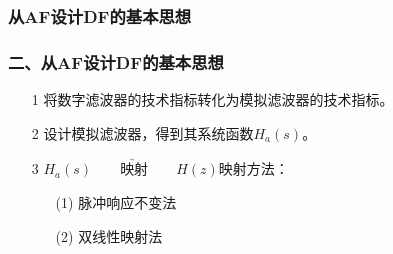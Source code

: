 \documentclass[notheorems,compress,mathserif,table]{beamer}
\begin{document}
\subsubsection{从AF设计DF的基本思想}
\begin{frame}[shrink]\frametitle{二、从AF设计DF的基本思想}%

\begin{enumerate}
  \item [1] 将数字滤波器的技术指标转化为模拟滤波器的技术指标。 \newline
  \item [2] 设计模拟滤波器，得到其系统函数$H_a(s)$。 \newline
  \item [3] $H_a(s)\quad\underrightarrow{\quad\mbox{映射}\quad}\quad H(z)$\quad 映射方法：\newline
      \begin{enumerate}
        \item [(1)]脉冲响应不变法 \newline
        \item [(2)]双线性映射法   \newline
      \end{enumerate}
\end{enumerate}
%
%
%
%
\end{frame}
%
%
\end{document}
